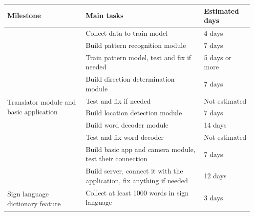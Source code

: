 \begin{table}[H]
	\begin{tabular}{ |p{4cm}|p{8cm}|l| }
		\hline
		Milestone                                                   & Main tasks                                                                  & Estimated days \\ \hline
		\multirow{10}{4cm}{Translator module and basic application} & Collect data to train model                                                 & 4 days         \\ \cline{2-3} 
		                                                            & Build pattern recognition module                                            & 7 days         \\ \cline{2-3} 
		                                                            & Train pattern model, test and fix if needed                                 & 5 days or more \\ \cline{2-3} 
		                                                            & Build direction determination module                                        & 7 days         \\ \cline{2-3} 
		                                                            & Test and fix if needed                                                      & Not estimated  \\ \cline{2-3} 
		                                                            & Build location detection module                                             & 7 days         \\ \cline{2-3} 
		                                                            & Build word decoder module                                                   & 14 days        \\ \cline{2-3} 
		                                                            & Test and fix word decoder                                                   & Not estimated  \\ \cline{2-3} 
		                                                            & Build basic app and camera module, test their connection                    & 7 days         \\ \cline{2-3} 
		                                                            & Build server, connect it with the application, fix anything if needed       & 12 days        \\ \hline
		\multirow{6}{4cm}{Sign language dictionary feature}         & Collect at least 1000 words in sign language                                & 3 days         \\ \cline{2-3} 

\end{tabular}
\end{table}
